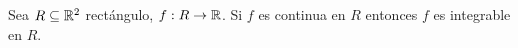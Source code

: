 \begin{proposicion}\label{pro:continua}
Sea $ R \subseteq \mathbb{R}^2 $ rect\'angulo, $ f:R \to \mathbb{R} $. Si $ f $ es continua en $ R $ entonces $ f $ es integrable en $ R $.
\end{proposicion}

%
